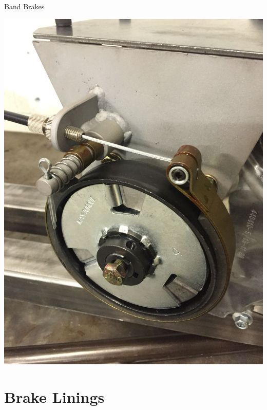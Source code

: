 \documentclass[10pt, svgnames]{beamer}
\begin{document}
\begin{frame}[label={sec:org600c893}]{Band Brakes}
\begin{center}
\includegraphics[height=0.9\textheight]{./pictures/band-brake.jpg}
\end{center}
\end{frame}

\section{Brake Linings}
\label{sec:org197949c}
\end{document}

